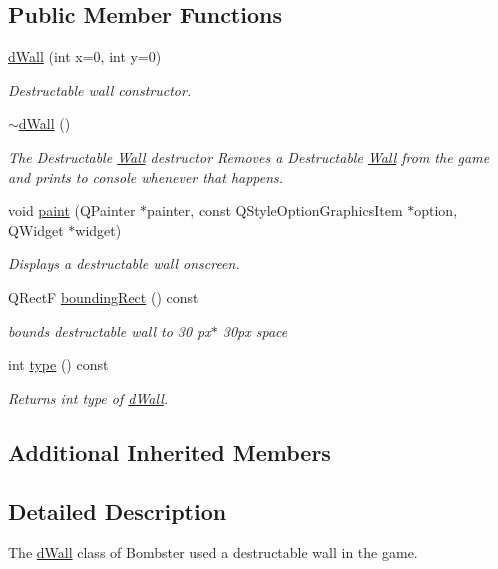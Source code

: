 \subsection*{Public Member Functions}
\begin{DoxyCompactItemize}
\item 
\hyperlink{classd_wall_a09862932157c8e5f8a59b22b3222d816}{d\-Wall} (int x=0, int y=0)
\begin{DoxyCompactList}\small\item\em Destructable wall constructor. \end{DoxyCompactList}\item 
\hyperlink{classd_wall_ae3e072cee7b80cf20387c3d634cb994a}{$\sim$d\-Wall} ()
\begin{DoxyCompactList}\small\item\em The Destructable \hyperlink{class_wall}{Wall} destructor Removes a Destructable \hyperlink{class_wall}{Wall} from the game and prints to console whenever that happens. \end{DoxyCompactList}\item 
void \hyperlink{classd_wall_aeaec158ea8576bfe6d40d8197ffceaf6}{paint} (Q\-Painter $\ast$painter, const Q\-Style\-Option\-Graphics\-Item $\ast$option, Q\-Widget $\ast$widget)
\begin{DoxyCompactList}\small\item\em Displays a destructable wall onscreen. \end{DoxyCompactList}\item 
Q\-Rect\-F \hyperlink{classd_wall_a84d4bba890333394f10c5497379d894c}{bounding\-Rect} () const 
\begin{DoxyCompactList}\small\item\em bounds destructable wall to 30 px$\ast$ 30px space \end{DoxyCompactList}\item 
int \hyperlink{classd_wall_a487ce8ea99822ad1e182e8319db62f9c}{type} () const 
\begin{DoxyCompactList}\small\item\em Returns int type of \hyperlink{classd_wall}{d\-Wall}. \end{DoxyCompactList}\end{DoxyCompactItemize}
\subsection*{Additional Inherited Members}


\subsection{Detailed Description}
The \hyperlink{classd_wall}{d\-Wall} class of Bombster used a destructable wall in the game. 

